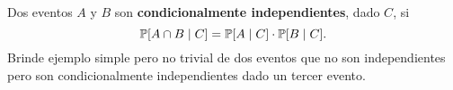 \begin{statement}{5}
  Dos eventos $A$ y $B$ son \textbf{condicionalmente independientes}, dado $C$, si
  \[
    \mathbb{P}[A \cap B \mid C] = \mathbb{P}[A \mid C] \cdot \mathbb{P}[B \mid C].
  \]
  Brinde ejemplo simple pero no trivial de dos eventos que no son independientes pero
  son condicionalmente independientes dado un tercer evento.
\end{statement}